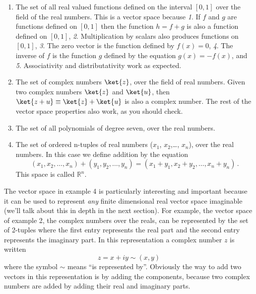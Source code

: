 \begin{enumerate}
\item The set of all real valued functions defined on the interval $[0, 1]$ over the field of the real numbers.
This is a vector space because \emph{1}. If $f$ and $g$ are functions defined on $[0, 1]$ then the function $h = f + g$ is also a function defined on $[0, 1]$, \emph{2}. Multiplication by scalars also produces functions on $[0, 1]$, \emph{3}. The zero vector is the function defined by $f(x)=0$, \emph{4}. The inverse of $f$ is the function $g$ defined by the equation $g(x) = -f(x)$, and \emph{5}. Associativity and distributativity work as expected.
\item The set of complex numbers $\ket{z}$, over the field of real numbers.
Given two complex numbers $\ket{z}$ and $\ket{u}$, then $\ket{z+u} \equiv \ket{z} + \ket{u}$ is also a complex number.
The rest of the vector space properties also work, as you should check.
\item The set of all polynomials of degree seven, over the real numbers.
\item The set of ordered n-tuples of real numbers ($x_1$, $x_2$,\ldots , $x_n$), over the real numbers.
In this case we define addition by the equation
\begin{equation*}
(x_1, x_2, \ldots, x_n) + (y_1, y_2, \ldots, y_n) = (x_1 + y_1, x_2 + y_2, \ldots, x_n + y_n) \, .
\end{equation*}
This space is called $\mathbb{R}^n$.
\end{enumerate}
The vector space in example 4 is particularly interesting and important because it can be used to represent \emph{any} finite dimensional real vector space imaginable (we'll talk about this in depth in the next section).
For example, the vector space of example 2, the complex numbers over the reals, can be represented by the set of 2-tuples where the first entry represents the real part and the second entry represents the imaginary part.
In this representation a complex number $z$ is written
\begin{equation*}
z = x + iy \sim (x,y)
\end{equation*}
where the symbol $\sim$ means ``is represented by''.
Obviously the way to add two vectors in this representation is by adding the components, because two complex numbers are added by adding their real and imaginary parts.

